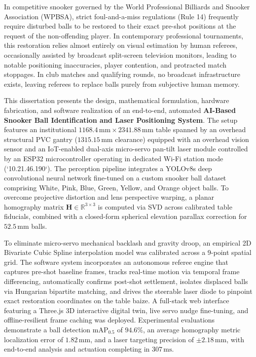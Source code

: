 \noindent In competitive snooker governed by the World Professional Billiards and Snooker Association (WPBSA), strict foul-and-a-miss regulations (Rule 14) frequently require disturbed balls to be restored to their exact pre-shot positions at the request of the non-offending player. In contemporary professional tournaments, this restoration relies almost entirely on visual estimation by human referees, occasionally assisted by broadcast split-screen television monitors, leading to notable positioning inaccuracies, player contention, and protracted match stoppages. In club matches and qualifying rounds, no broadcast infrastructure exists, leaving referees to replace balls purely from subjective human memory.

\noindent This dissertation presents the design, mathematical formulation, hardware fabrication, and software realization of an end-to-end, automated \textbf{AI-Based Snooker Ball Identification and Laser Positioning System}. The setup features an institutional $1168.4\,\text{mm} \times 2341.88\,\text{mm}$ table spanned by an overhead structural PVC gantry ($1315.15\,\text{mm}$ clearance) equipped with an overhead vision sensor and an IoT-enabled dual-axis micro-servo pan-tilt laser module controlled by an ESP32 microcontroller operating in dedicated Wi-Fi station mode (`10.21.46.190`). The perception pipeline integrates a YOLOv8s deep convolutional neural network fine-tuned on a custom snooker ball dataset comprising White, Pink, Blue, Green, Yellow, and Orange object balls. To overcome projective distortion and lens perspective warping, a planar homography matrix $\mathbf{H} \in \mathbb{R}^{3 \times 3}$ is computed via SVD across calibrated table fiducials, combined with a closed-form spherical elevation parallax correction for $52.5\,\text{mm}$ balls.

\noindent To eliminate micro-servo mechanical backlash and gravity droop, an empirical 2D Bivariate Cubic Spline interpolation model was calibrated across a 9-point spatial grid. The software system incorporates an autonomous referee engine that captures pre-shot baseline frames, tracks real-time motion via temporal frame differencing, automatically confirms post-shot settlement, isolates displaced balls via Hungarian bipartite matching, and drives the steerable laser diode to pinpoint exact restoration coordinates on the table baize. A full-stack web interface featuring a Three.js 3D interactive digital twin, live servo nudge fine-tuning, and offline-resilient frame caching was deployed. Experimental evaluations demonstrate a ball detection $\text{mAP}_{0.5}$ of $94.6\%$, an average homography metric localization error of $1.82\,\text{mm}$, and a laser targeting precision of $\pm 2.18\,\text{mm}$, with end-to-end analysis and actuation completing in $307\,\text{ms}$.

